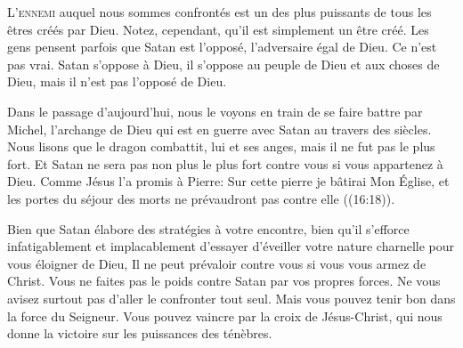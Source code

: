 


\lettrine{L}{'ennemi} auquel nous sommes confrontés est un des plus puissants
 de tous les êtres créés par Dieu. Notez, cependant, qu'il est simplement
 un être créé. Les gens pensent parfois que Satan est l'opposé,
 l'adversaire égal de Dieu. Ce n'est pas vrai. Satan s'oppose à Dieu,
 il s'oppose au peuple de Dieu et aux choses de Dieu,
 mais il n'est pas l'opposé de Dieu.


Dans le passage d'aujourd'hui, nous le voyons en train de se faire battre
 par Michel, l'archange de Dieu qui est en guerre avec Satan
 au travers des siècles. Nous lisons que 
 \Og le dragon combattit, lui et ses anges,
 mais il ne fut pas le plus fort. \Fg{}
 Et Satan ne sera pas non plus le plus fort contre vous
 si vous appartenez à Dieu. Comme Jésus l'a promis à Pierre: 
 \Og Sur cette pierre je bâtirai Mon Église, et les portes du séjour
 des morts ne prévaudront pas contre elle \Fg{} ((16:18)).

Bien que Satan élabore des stratégies à votre encontre,
 bien qu'il s'efforce infatigablement et implacablement d'essayer d'éveiller
 votre nature charnelle pour vous éloigner de Dieu, Il ne peut prévaloir
 contre vous si vous vous armez de Christ.
 Vous ne faites pas le poids contre Satan par vos propres forces.
 Ne vous avisez surtout pas d'aller le confronter tout seul.
 Mais vous pouvez tenir bon dans la force du Seigneur.
 Vous pouvez vaincre par la croix de Jésus-Christ,
 qui nous donne la victoire sur les puissances des ténèbres.

\dvrule





